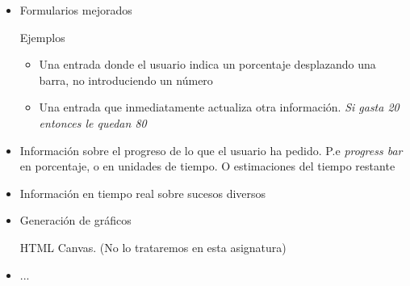 \documentclass[ucs]{beamer}
\begin{document}
\begin{frame}[fragile]

\begin{itemize}


    \item
Formularios mejorados

Ejemplos

    \begin{itemize}
    \item
Una entrada donde el usuario indica un porcentaje desplazando una barra, no introduciendo un número
    \item
Una entrada que inmediatamente actualiza otra información. \emph{Si gasta 20 entonces le quedan 80}
    \end{itemize}

    \item
Información sobre el progreso de lo que el usuario ha pedido. P.e \emph{progress bar}
en porcentaje, o en unidades de tiempo. O estimaciones del tiempo restante

    \item
Información en tiempo real sobre sucesos diversos
\item
Generación de gráficos 


HTML Canvas.
(No lo trataremos en esta asignatura)

\item

...
\end{itemize}

\end{frame}
\end{document}
